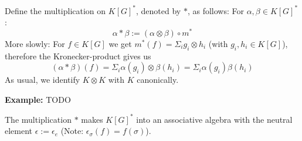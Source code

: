 \begin{definition}
  Define the multiplication on $ K \left\lbrack G \right\rbrack^\ast $, denoted by $\ast$, as follows:  For $\alpha, \beta \in K \left\lbrack G \right\rbrack^\ast$:  
  \begin{equation}
    \alpha \ast \beta := \left( \alpha \otimes \beta \right) \circ m^\ast
  \end{equation}
  More slowly: For $f \in K \left\lbrack G \right\rbrack$ we get $m^\ast \left( f \right) = \Sigma_i g_i \otimes h_i$ (with $g_i , h_i \in K \left\lbrack G \right\rbrack$), therefore the Kronecker-product gives us
  \begin{equation}
    \left( \alpha \ast \beta \right) \left( f \right) = \Sigma_i \alpha \left( g_i \right) \otimes \beta \left( h_i \right) = \Sigma_i \alpha \left( g_i \right) \beta \left( h_i \right)
  \end{equation}
  As usual, we identify $K \otimes K$ with $K$ canonically.  
\end{definition}
%
%

\textbf{Example:} TODO

\begin{proposition}
The multiplication $\ast$ makes $K \left\lbrack G \right\rbrack^\ast$ into an associative algebra with the neutral element $ \epsilon := \epsilon_e$ (Note: $\epsilon_\sigma \left( f \right) = f \left( \sigma \right)$).
\end{proposition}

